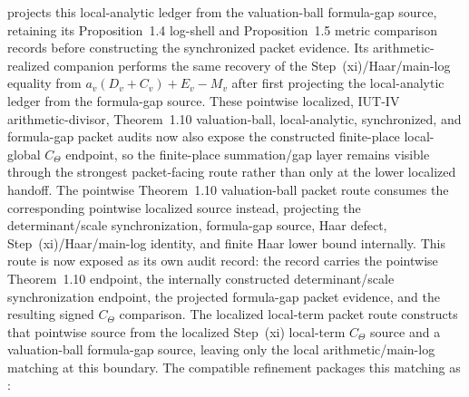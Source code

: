\begin{proposition}
  projects this local-analytic ledger from the valuation-ball formula-gap
  source, retaining its Proposition~1.4 log-shell and Proposition~1.5 metric
  comparison records before constructing the synchronized packet evidence.
  Its arithmetic-realized companion
  performs the same recovery of the Step~(xi)/Haar/main-log equality from
  \(a_v(D_v+C_v)+E_v-M_v\) after first projecting the local-analytic ledger
  from the formula-gap source.
  These pointwise localized, IUT-IV arithmetic-divisor, Theorem~1.10
  valuation-ball, local-analytic, synchronized, and formula-gap packet audits
  now also expose the constructed finite-place local-global \(C_\Theta\)
  endpoint, so the finite-place summation/gap layer remains visible through
  the strongest packet-facing route rather than only at the lower localized
  handoff.
  The pointwise Theorem~1.10 valuation-ball packet route
  consumes the corresponding pointwise localized source instead, projecting
  the determinant/scale synchronization, formula-gap source, Haar defect,
  Step~(xi)/Haar/main-log identity, and finite Haar lower bound internally.
  This route is now exposed as its own audit record: the record carries the
  pointwise Theorem~1.10 endpoint, the internally constructed
  determinant/scale synchronization endpoint, the projected formula-gap packet
  evidence, and the resulting signed \(C_\Theta\) comparison.
  The localized local-term packet route
  constructs that pointwise source from the localized Step~(xi)
  local-term \(C_\Theta\) source and a valuation-ball formula-gap source,
  leaving only the local arithmetic/main-log matching at this boundary.
  The compatible refinement
  packages this matching as
  :

\end{proposition}
